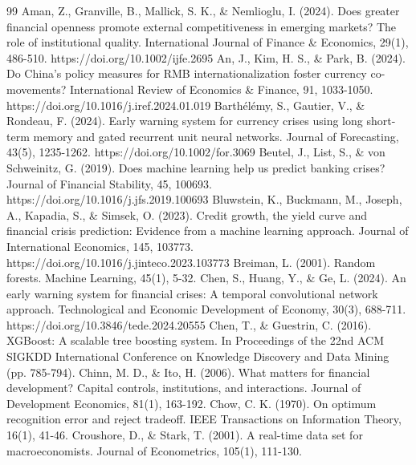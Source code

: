 \documentclass[preprint,12pt,authoryear]{elsarticle}
\begin{document}
\begin{thebibliography}{99}
 Aman, Z., Granville, B., Mallick, S. K., \& Nemlioglu, I. (2024). Does greater financial openness promote external competitiveness in emerging markets? The role of institutional quality. International Journal of Finance \& Economics, 29(1), 486-510. https://doi.org/10.1002/ijfe.2695
 An, J., Kim, H. S., \& Park, B. (2024). Do China's policy measures for RMB internationalization foster currency co-movements? International Review of Economics \& Finance, 91, 1033-1050. https://doi.org/10.1016/j.iref.2024.01.019
 Barthélémy, S., Gautier, V., \& Rondeau, F. (2024). Early warning system for currency crises using long short-term memory and gated recurrent unit neural networks. Journal of Forecasting, 43(5), 1235-1262. https://doi.org/10.1002/for.3069
 Beutel, J., List, S., \& von Schweinitz, G. (2019). Does machine learning help us predict banking crises? Journal of Financial Stability, 45, 100693. https://doi.org/10.1016/j.jfs.2019.100693
 Bluwstein, K., Buckmann, M., Joseph, A., Kapadia, S., \& Simsek, O. (2023). Credit growth, the yield curve and financial crisis prediction: Evidence from a machine learning approach. Journal of International Economics, 145, 103773. https://doi.org/10.1016/j.jinteco.2023.103773
 Breiman, L. (2001). Random forests. Machine Learning, 45(1), 5-32.
 Chen, S., Huang, Y., \& Ge, L. (2024). An early warning system for financial crises: A temporal convolutional network approach. Technological and Economic Development of Economy, 30(3), 688-711. https://doi.org/10.3846/tede.2024.20555
 Chen, T., \& Guestrin, C. (2016). XGBoost: A scalable tree boosting system. In Proceedings of the 22nd ACM SIGKDD International Conference on Knowledge Discovery and Data Mining (pp. 785-794).
 Chinn, M. D., \& Ito, H. (2006). What matters for financial development? Capital controls, institutions, and interactions. Journal of Development Economics, 81(1), 163-192.
 Chow, C. K. (1970). On optimum recognition error and reject tradeoff. IEEE Transactions on Information Theory, 16(1), 41-46.
 Croushore, D., \& Stark, T. (2001). A real-time data set for macroeconomists. Journal of Econometrics, 105(1), 111-130.

\end{thebibliography}
\end{document}
